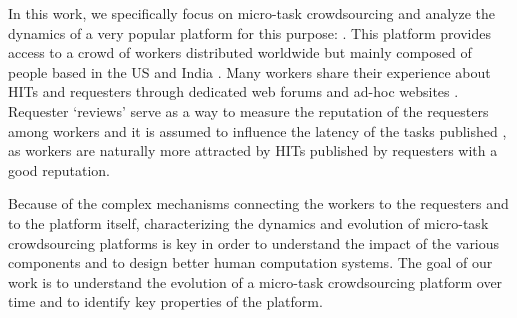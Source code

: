 In this work, we specifically focus on micro-task crowdsourcing and analyze the dynamics of a  very popular  platform for this purpose: \amt{}. This platform provides access to a crowd of workers distributed worldwide but mainly composed of people based in the US and India \cite{mturk}. Many \amt{} workers share their experience about HITs and requesters through dedicated web forums and ad-hoc websites \cite{turkopticon}. Requester `reviews' serve as a way to measure the reputation of the requesters among workers and it is assumed to influence the latency of the tasks published \cite{TOreputation}, as workers are naturally more attracted by HITs published by  requesters with a good reputation.





Because of the complex mechanisms connecting the workers to the requesters and to the platform itself, characterizing the dynamics and evolution of micro-task crowdsourcing platforms is key in order to understand the impact of the various components and to design better human computation systems. The goal of our work is to understand the evolution of a micro-task crowdsourcing platform over time and to identify key properties of the platform.

